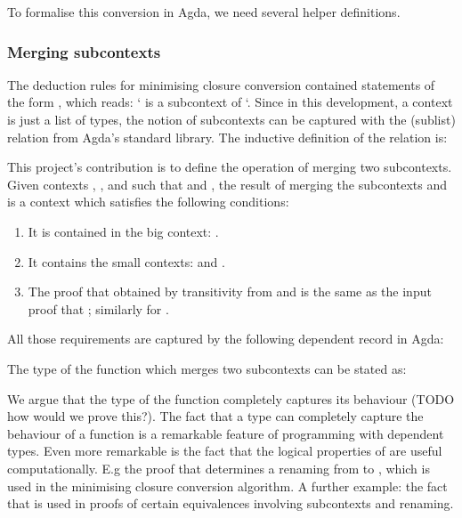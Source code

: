 \documentclass[bsc,frontabs,oneside,singlespacing,parskip,deptreport]{infthesis}
\theoremstyle{definition}
\theoremstyle{lemma}
\begin{document}
To formalise this conversion in Agda, we need several helper
definitions.

\subsubsection{Merging subcontexts}
\label{sec:merging-subcontexts}

The deduction rules for minimising closure conversion contained
statements of the form , which reads: ` is a
subcontext of `. Since in this development, a context is just a
list of types, the notion of subcontexts can be captured with the
 (sublist) relation from Agda's standard library. The
inductive definition of the relation is:


This project's contribution is to define the operation of merging two
subcontexts. Given contexts , , and  such that
 and , the result of merging the subcontexts
 and  is a context  which satisfies the following
conditions:

\begin{enumerate}
\item It is contained in the big context: .
\item It contains the small contexts:  and .
\item The proof that  obtained by transitivity from  and  is the same as the input proof that ; similarly for .
\end{enumerate}

All those requirements are captured by the following dependent record
in Agda:


The type of the function which merges two subcontexts can be stated
as:


We argue that the type of the function completely captures its
behaviour (TODO how would we prove this?). The fact that a type can
completely capture the behaviour of a function is a remarkable feature
of programming with dependent types. Even more remarkable is the fact
that the logical properties of  are useful computationally. E.g
the proof that  determines a renaming from  to
, which is used in the minimising closure conversion
algorithm. A further example: the fact that  is used in proofs of certain equivalences involving subcontexts
and renaming.
\end{document}
